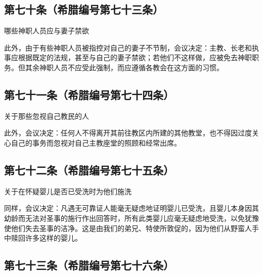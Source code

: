 
\subsection{第七十条（希腊编号第七十三条）}

哪些神职人员应与妻子禁欲\par

此外，由于有些神职人员被指控对自己的妻子不节制，会议决定：主教、长老和执事应根据既定的法规，甚至与自己的妻子禁欲；若他们不这样做，应被免去神职职务。但其余神职人员不应受此强制，而应遵循各教会在这方面的习惯。\par


\subsection{第七十一条（希腊编号第七十四条）}

关于那些忽视自己教民的人\par

此外，会议决定：任何人不得离开其前往教区内所建的其他教堂，也不得因过度关心自己的事务而忽视对自己主教座堂的照顾和经常出席。\par


\subsection{第七十二条（希腊编号第七十五条）}

关于在怀疑婴儿是否已受洗时为他们施洗\par

同样，会议决定：凡遇无可靠证人能毫无疑虑地证明婴儿已受洗，且婴儿本身因其幼龄而无法对圣事的施行作出回答时，所有此类婴儿应毫无疑虑地受洗，以免犹豫使他们失去圣事的洁净。这是由我们的弟兄、特使所敦促的，因为他们从野蛮人手中赎回许多这样的婴儿。\par


\subsection{第七十三条（希腊编号第七十六条）}

